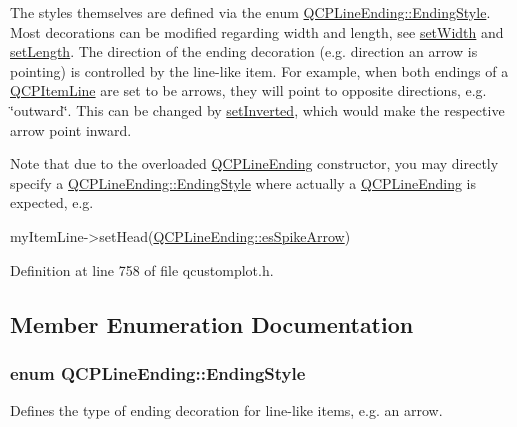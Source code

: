 The styles themselves are defined via the enum \hyperlink{class_q_c_p_line_ending_a5ef16e6876b4b74959c7261d8d4c2cd5}{Q\-C\-P\-Line\-Ending\-::\-Ending\-Style}. Most decorations can be modified regarding width and length, see \hyperlink{class_q_c_p_line_ending_a26dc020ea985a72cc25881ce2115e34e}{set\-Width} and \hyperlink{class_q_c_p_line_ending_ae36fa01763751cd64b7f56c3507e935a}{set\-Length}. The direction of the ending decoration (e.\-g. direction an arrow is pointing) is controlled by the line-\/like item. For example, when both endings of a \hyperlink{class_q_c_p_item_line}{Q\-C\-P\-Item\-Line} are set to be arrows, they will point to opposite directions, e.\-g. \char`\"{}outward\char`\"{}. This can be changed by \hyperlink{class_q_c_p_line_ending_a580e4e2360b35ebb8d68f3494aa2335d}{set\-Inverted}, which would make the respective arrow point inward.

Note that due to the overloaded \hyperlink{class_q_c_p_line_ending}{Q\-C\-P\-Line\-Ending} constructor, you may directly specify a \hyperlink{class_q_c_p_line_ending_a5ef16e6876b4b74959c7261d8d4c2cd5}{Q\-C\-P\-Line\-Ending\-::\-Ending\-Style} where actually a \hyperlink{class_q_c_p_line_ending}{Q\-C\-P\-Line\-Ending} is expected, e.\-g.
\begin{DoxyCode}
myItemLine->setHead(\hyperlink{class_q_c_p_line_ending_a5ef16e6876b4b74959c7261d8d4c2cd5ab9964d0d03f812d1e79de15edbeb2cbf}{QCPLineEnding::esSpikeArrow}) 
\end{DoxyCode}
 

Definition at line 758 of file qcustomplot.\-h.



\subsection{Member Enumeration Documentation}
\hypertarget{class_q_c_p_line_ending_a5ef16e6876b4b74959c7261d8d4c2cd5}{
\subsubsection[{Ending\-Style}]{\setlength{\rightskip}{0pt plus 5cm}enum {\bf Q\-C\-P\-Line\-Ending\-::\-Ending\-Style}}}\label{class_q_c_p_line_ending_a5ef16e6876b4b74959c7261d8d4c2cd5}
Defines the type of ending decoration for line-\/like items, e.\-g. an arrow.



